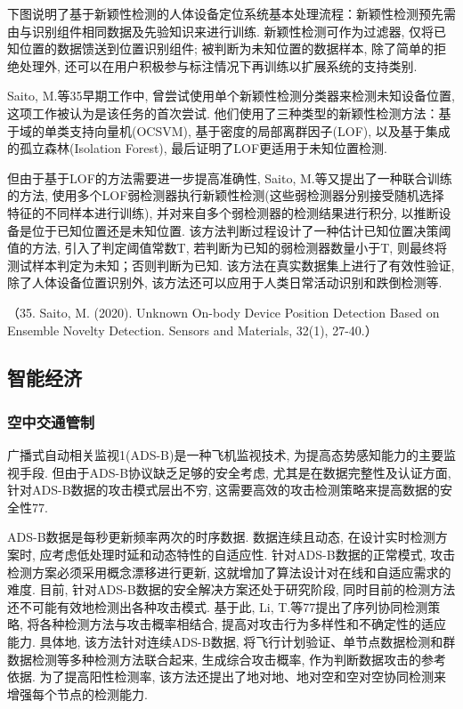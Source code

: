 \documentclass{Style/aas}
\begin{document}
\begin{multicols}{2}
  下图说明了基于新颖性检测的人体设备定位系统基本处理流程：新颖性检测预先需由与识别组件相同数据及先验知识来进行训练. 新颖性检测可作为过滤器, 仅将已知位置的数据馈送到位置识别组件; 被判断为未知位置的数据样本, 除了简单的拒绝处理外, 还可以在用户积极参与标注情况下再训练以扩展系统的支持类别.

  Saito, M.等35早期工作中, 曾尝试使用单个新颖性检测分类器来检测未知设备位置, 这项工作被认为是该任务的首次尝试. 他们使用了三种类型的新颖性检测方法：基于域的单类支持向量机(OCSVM), 基于密度的局部离群因子(LOF), 以及基于集成的孤立森林(Isolation Forest), 最后证明了LOF更适用于未知位置检测.

  但由于基于LOF的方法需要进一步提高准确性, Saito, M.等又提出了一种联合训练的方法, 使用多个LOF弱检测器执行新颖性检测(这些弱检测器分别接受随机选择特征的不同样本进行训练), 并对来自多个弱检测器的检测结果进行积分, 以推断设备是位于已知位置还是未知位置. 该方法判断过程设计了一种估计已知位置决策阈值的方法, 引入了判定阈值常数T, 若判断为已知的弱检测器数量小于T, 则最终将测试样本判定为未知；否则判断为已知. 该方法在真实数据集上进行了有效性验证, 除了人体设备位置识别外, 该方法还可以应用于人类日常活动识别和跌倒检测等.

  （35.	Saito, M. (2020). Unknown On-body Device Position Detection Based on Ensemble Novelty Detection. Sensors and Materials, 32(1), 27-40.）

  \subsection{智能经济}
  \subsubsection{空中交通管制}
  广播式自动相关监视1(ADS-B)是一种飞机监视技术, 为提高态势感知能力的主要监视手段. 但由于ADS-B协议缺乏足够的安全考虑, 尤其是在数据完整性及认证方面,  针对ADS-B数据的攻击模式层出不穷, 这需要高效的攻击检测策略来提高数据的安全性77.

  ADS-B数据是每秒更新频率两次的时序数据. 数据连续且动态, 在设计实时检测方案时, 应考虑低处理时延和动态特性的自适应性. 针对ADS-B数据的正常模式, 攻击检测方案必须采用概念漂移进行更新, 这就增加了算法设计对在线和自适应需求的难度. 目前, 针对ADS-B数据的安全解决方案还处于研究阶段, 同时目前的检测方法还不可能有效地检测出各种攻击模式. 基于此, Li, T.等77提出了序列协同检测策略, 将各种检测方法与攻击概率相结合, 提高对攻击行为多样性和不确定性的适应能力. 具体地, 该方法针对连续ADS-B数据, 将飞行计划验证、单节点数据检测和群数据检测等多种检测方法联合起来, 生成综合攻击概率, 作为判断数据攻击的参考依据. 为了提高阳性检测率, 该方法还提出了地对地、地对空和空对空协同检测来增强每个节点的检测能力.


\end{multicols}
\end{document}
